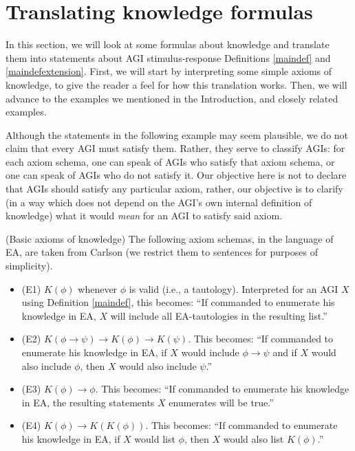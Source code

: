 \documentclass[runningheads]{llncs}
\begin{document}
\section{Translating knowledge formulas}
\label{appsection}

In this section, we will look at some formulas about knowledge and translate them into
statements about AGI stimulus-response Definitions \ref{maindef} and \ref{maindefextension}.
First, we will start by interpreting some simple axioms of knowledge, to give the reader
a feel for how this translation works. Then, we will advance to the examples we mentioned
in the Introduction, and closely related examples.

Although the statements in the following example may seem plausible,
we do not claim that every AGI must satisfy them. Rather, they serve to classify AGIs:
for each axiom schema, one can speak of AGIs who satisfy that axiom schema, or one can
speak of AGIs who do not satisfy it. Our objective here is not to declare that AGIs
should satisfy any particular axiom, rather, our objective is to clarify (in a way which
does not depend on the AGI's own internal definition of knowledge) what it would
\emph{mean} for an AGI to satisfy said axiom.

\begin{example}
\label{basicexamples}
  (Basic axioms of knowledge) The following axiom schemas, in the language
  of EA, are taken from Carlson \cite{carlson}
  (we restrict them to sentences for purposes of simplicity).
  \begin{itemize}
    \item (E1) $K(\phi)$ whenever $\phi$ is valid (i.e., a tautology).
    Interpreted for an AGI $X$ using Definition \ref{maindef}, this becomes:
    ``If commanded to enumerate his knowledge in EA, $X$ will include
    all EA-tautologies in the resulting list.''
    \item (E2) $K(\phi\rightarrow\psi)\rightarrow K(\phi)\rightarrow K(\psi)$.
    This becomes: ``If commanded to enumerate his knowledge in EA,
    if $X$ would include $\phi\rightarrow\psi$ and if $X$ would also include
    $\phi$, then $X$ would also include $\psi$.''
    \item (E3) $K(\phi)\rightarrow\phi$. This becomes: ``If commanded to enumerate
    his knowledge in EA, the resulting statements $X$ enumerates
    will be true.''
    \item (E4) $K(\phi)\rightarrow K(K(\phi))$. This becomes: ``If commanded to
    enumerate his knowledge in EA, if $X$ would list $\phi$,
    then $X$ would also list $K(\phi)$.''
  \end{itemize}
\end{example}
\end{document}
